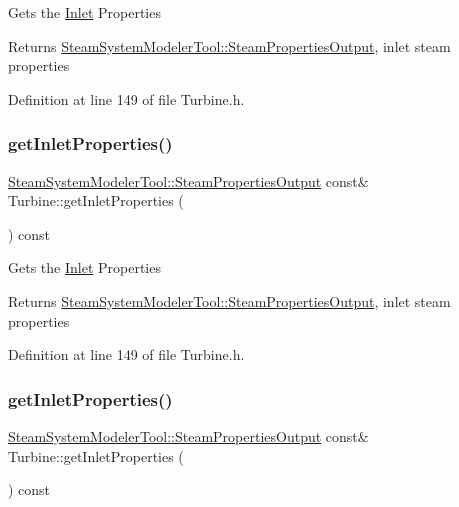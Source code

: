 Gets the \hyperlink{class_inlet}{Inlet} Properties

\begin{DoxyReturn}{Returns}
\hyperlink{struct_steam_system_modeler_tool_1_1_steam_properties_output}{Steam\+System\+Modeler\+Tool\+::\+Steam\+Properties\+Output}, inlet steam properties 
\end{DoxyReturn}


Definition at line 149 of file Turbine.\+h.

\mbox{\label{class_turbine_a7a906cf74affed9acfa4045964eccbf6}} 
\subsubsection{\texorpdfstring{get\+Inlet\+Properties()}{getInletProperties()}\hspace{0.1cm}{\footnotesize\ttfamily [2/3]}}
{\footnotesize\ttfamily \hyperlink{struct_steam_system_modeler_tool_1_1_steam_properties_output}{Steam\+System\+Modeler\+Tool\+::\+Steam\+Properties\+Output} const\& Turbine\+::get\+Inlet\+Properties (\begin{DoxyParamCaption}{ }\end{DoxyParamCaption}) const\hspace{0.3cm}{\ttfamily [inline]}}

Gets the \hyperlink{class_inlet}{Inlet} Properties

\begin{DoxyReturn}{Returns}
\hyperlink{struct_steam_system_modeler_tool_1_1_steam_properties_output}{Steam\+System\+Modeler\+Tool\+::\+Steam\+Properties\+Output}, inlet steam properties 
\end{DoxyReturn}


Definition at line 149 of file Turbine.\+h.

\mbox{\label{class_turbine_a7a906cf74affed9acfa4045964eccbf6}} 
\subsubsection{\texorpdfstring{get\+Inlet\+Properties()}{getInletProperties()}\hspace{0.1cm}{\footnotesize\ttfamily [3/3]}}
{\footnotesize\ttfamily \hyperlink{struct_steam_system_modeler_tool_1_1_steam_properties_output}{Steam\+System\+Modeler\+Tool\+::\+Steam\+Properties\+Output} const\& Turbine\+::get\+Inlet\+Properties (\begin{DoxyParamCaption}{ }\end{DoxyParamCaption}) const\hspace{0.3cm}{\ttfamily [inline]}}

